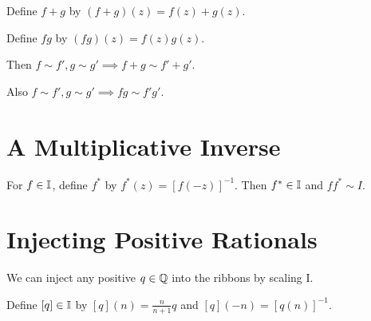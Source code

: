 \documentclass{article}
\newcommand{\ribbons}{\Bbb I}
\newcommand{\ident}{I}
\begin{document}
{{\begin{huge}
Define $f + g$ by $(f + g)(z) = f(z) + g(z)$.

Define $fg$ by $(fg)(z) = f(z)g(z)$. 

Then $f \sim f', g \sim g' \implies f + g\sim f' + g'$.

Also $f \sim f', g \sim g' \implies fg \sim f'g'$.\\


\section{A Multiplicative Inverse}

For $f \in \ribbons$, define $f^*$ by $f^*(z) =  [ f(-z) ]^{-1} $. Then $f^* \in \ribbons$ and $ff^* \sim \ident$.

\section{Injecting Positive Rationals}

We can inject any positive $q \in \Bbb Q$ into the ribbons by scaling I. 

Define $[q] \in \ribbons$ by $ [q](n) = \frac{n}{n+1}q$ and $[q](-n) = [q(n)]^{-1}$.



\end{huge}

}}
\end{document}
